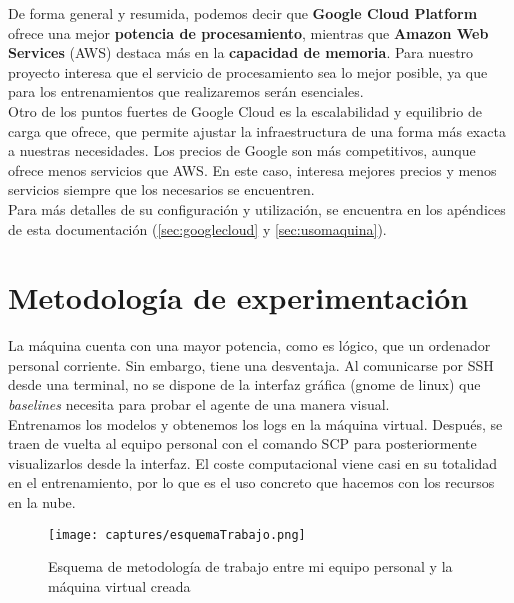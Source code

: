 \documentclass[11pt,fleqn]{book} %
\begin{document}
De forma general y resumida, podemos decir que \textbf{Google Cloud Platform} ofrece una mejor \textbf{potencia de procesamiento}, mientras que \textbf{Amazon Web Services} (AWS) destaca más en la \textbf{capacidad de memoria}. Para nuestro proyecto interesa que el servicio de procesamiento sea lo mejor posible, ya que para los entrenamientos que realizaremos serán esenciales. \\

Otro de los puntos fuertes de Google Cloud es la escalabilidad y equilibrio de carga que ofrece, que permite ajustar la infraestructura de una forma más exacta a nuestras necesidades. Los precios de Google son más competitivos, aunque ofrece menos servicios que AWS. En este caso, interesa mejores precios y menos servicios siempre que los necesarios se encuentren. \\

Para más detalles de su configuración y utilización, se encuentra en los apéndices de esta documentación (\ref{sec:googlecloud} y \ref{sec:usomaquina}).

\section{Metodología de experimentación}

La máquina cuenta con una mayor potencia, como es lógico, que un ordenador personal corriente. Sin embargo, tiene una desventaja. Al comunicarse por SSH desde una terminal, no se dispone de la interfaz gráfica (gnome de linux) que \textit{baselines} necesita para probar el agente de una manera visual. \\

Entrenamos los modelos y obtenemos los logs en la máquina virtual. Después, se traen de vuelta al equipo personal con el comando SCP para posteriormente visualizarlos desde la interfaz. El coste computacional viene casi en su totalidad en el entrenamiento, por lo que es el uso concreto que hacemos con los recursos en la nube.

\begin{figure}[H]
	\centering\texttt{[image: captures/esquemaTrabajo.png]}
	\caption{Esquema de metodología de trabajo entre mi equipo personal y la máquina virtual creada}
	\label{fig:formaTrabajo} %
\end{figure} 
\end{document}
